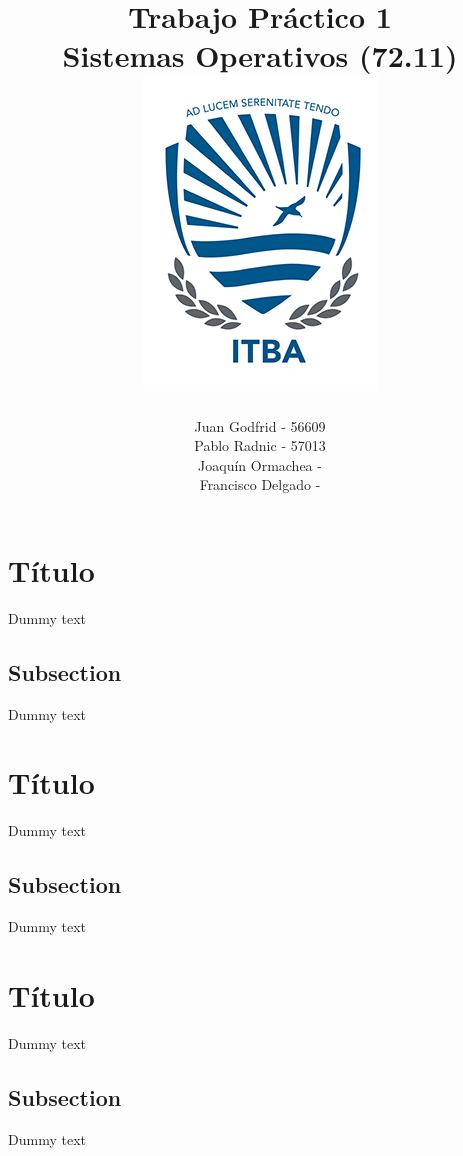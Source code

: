 \documentclass[10pt,a4paper]{report}
\title{
	\bf\color{darkcerulean} Trabajo Práctico 1 \\
	\color{black}Sistemas Operativos (72.11) \\
	\includegraphics{itba-escudo2}
	}
\author{Juan Godfrid - 56609 \\Pablo Radnic - 57013 \\ Joaquín Ormachea - \\Francisco Delgado -}
\begin{document}
\maketitle

\newpage
\tableofcontents
\newpage

\chapter{Título}

Dummy text

\section{Subsection}

Dummy text

\chapter{Título}

Dummy text

\section{Subsection}

Dummy text

\chapter{Título}

Dummy text

\section{Subsection}

Dummy text
\end{document}
